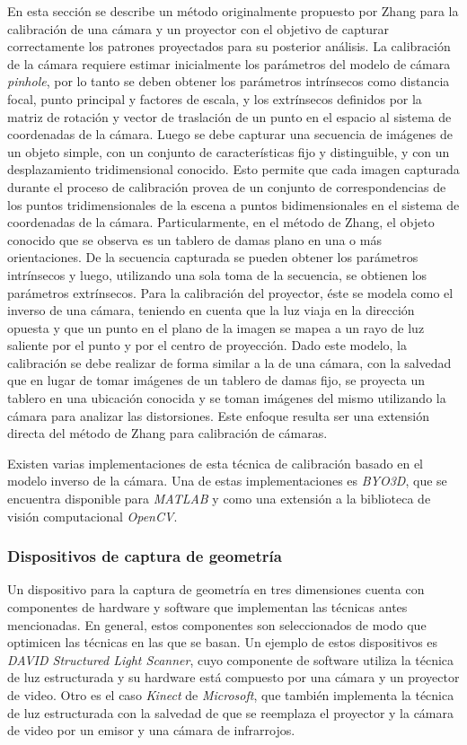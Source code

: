 En esta sección se describe un método originalmente propuesto por Zhang\cite{ZhangS} para la calibración de una cámara y un proyector con el objetivo de capturar correctamente los patrones proyectados para su posterior análisis.
La calibración de la cámara requiere estimar inicialmente los parámetros del modelo de cámara \emph{pinhole}, por lo tanto se deben obtener los parámetros intrínsecos como distancia focal, punto principal y factores de escala, y los extrínsecos definidos por la matriz de rotación y vector de traslación de un punto en el espacio al sistema de coordenadas de la cámara.
Luego se debe capturar una secuencia de imágenes de un objeto simple, con un conjunto de características fijo y distinguible, y con un desplazamiento tridimensional conocido. Esto permite que cada imagen capturada durante el proceso de calibración provea de un conjunto de correspondencias de los puntos tridimensionales de la escena a puntos bidimensionales en el sistema de coordenadas de la cámara. Particularmente, en el método de Zhang, el objeto conocido que se observa es un tablero de damas plano en una o más orientaciones. De la secuencia capturada se pueden obtener los parámetros intrínsecos y luego, utilizando una sola toma de la secuencia, se obtienen los parámetros extrínsecos.
Para la calibración del proyector, éste se modela como el inverso de una cámara, teniendo en cuenta que la luz viaja en la dirección opuesta y que un punto en el plano de la imagen se mapea a un rayo de luz saliente por el punto y por el centro de proyección.
Dado este modelo, la calibración se debe realizar de forma similar a la de una cámara, con la salvedad que en lugar de tomar imágenes de un tablero de damas fijo, se proyecta un tablero en una ubicación conocida y se toman imágenes del mismo utilizando la cámara para analizar las distorsiones. Este enfoque resulta ser una extensión directa del método de Zhang para calibración de cámaras.

Existen varias implementaciones de esta técnica de calibración basado en el modelo inverso de la cámara. Una de estas implementaciones es \emph{BYO3D}\cite{BYO3D}, que se encuentra disponible para \emph{MATLAB}\cite{MATLAB} y como una extensión a la biblioteca de visión computacional \emph{OpenCV}\cite{OpenCV}.

\subsubsection{Dispositivos de captura de geometría}

Un dispositivo para la captura de geometría en tres dimensiones cuenta con componentes de hardware y software que implementan las técnicas antes mencionadas.
En general, estos componentes son seleccionados de modo que optimicen las técnicas en las que se basan.
Un ejemplo de estos dispositivos es \emph{DAVID Structured Light Scanner\cite{DAVID}}, cuyo componente de software utiliza la técnica de luz estructurada y su hardware está compuesto por una cámara y un proyector de video. Otro es el caso \emph{Kinect} de \emph{Microsoft}, que también implementa la técnica de luz estructurada con la salvedad de que se reemplaza el proyector y la cámara de video por un emisor y una cámara de infrarrojos.

